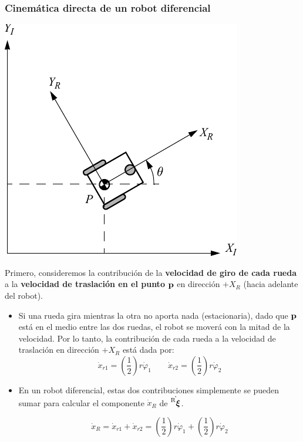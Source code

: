 \begin{frame}
    \frametitle{Cinemática directa de un robot diferencial}
    \footnotesize
    \begin{center}
        \includegraphics[width=0.15\columnwidth]{./images/coordinate_systems.pdf}
    \end{center}
    
    
    Primero, consideremos la contribución de la {\bf velocidad de giro de cada rueda} a la {\bf velocidad de traslación en el punto $\boldsymbol{\mathbf{p}}$} en dirección $+X_{R}$ (hacia adelante del robot).
    
    \begin{itemize}
        \item Si una rueda gira mientras la otra no aporta nada (estacionaria), dado que $\boldsymbol{\mathbf{p}}$ está en el medio entre las dos ruedas, el robot se moverá con la mitad de la velocidad. Por lo tanto, la contribución de cada rueda a la velocidad de traslación en dirección $+X_{R}$ está dada por:
        \begin{equation*}
            \dot{x}_{r1} = \left(\frac{1}{2}\right)r\dot{\varphi}_{1} \qquad
            \dot{x}_{r2} = \left(\frac{1}{2}\right)r\dot{\varphi}_{2}
        \end{equation*}
    
        \item En un robot diferencial, estas dos contribuciones simplemente se pueden sumar para calcular el componente $\dot{x}_{R}$ de $\dot{\prescript{\mathrm{R}}{}{{\boldsymbol{\mathbf{\xi}}}_\mathrm{}}}$.
        
        \begin{equation*}
            \dot{x}_{R} = \dot{x}_{r1} + \dot{x}_{r2} = \left(\frac{1}{2}\right)r\dot{\varphi}_{1} + \left(\frac{1}{2}\right)r\dot{\varphi}_{2}
        \end{equation*}
    \end{itemize}

   
\end{frame}

